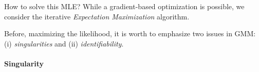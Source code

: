 
How to solve this MLE? While a gradient-based optimization is possible, we consider the iterative \textit{Expectation Maximization} algorithm.

Before, maximizing the likelihood, it is worth to emphasize two issues in GMM: (i) \textit{singularities} and (ii) \textit{identifiability}.

\paragraph{Singularity}


